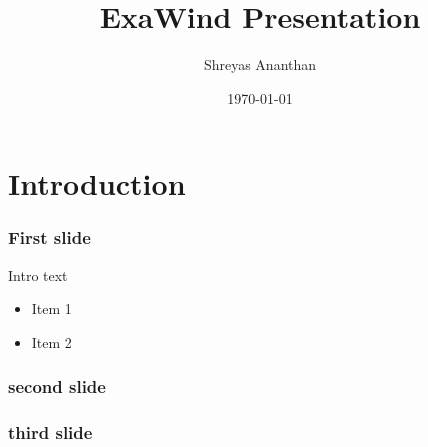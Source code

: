 \documentclass[aspectratio=1610,10pt]{beamer}
\title{ExaWind Presentation}
\author{Shreyas Ananthan}
\institute[NREL]{National Renewable Energy Laboratory \\ Golden, CO}
\date{\today}
\begin{document}
\maketitle

\section{Introduction}

\begin{frame}
  \frametitle{First slide}
  Intro text
  \begin{itemize}
  \item Item 1
  \item Item 2
  \end{itemize}
\end{frame}

\begin{frame}
  \frametitle{second slide}
\end{frame}

\begin{frame}
  \frametitle{third slide}
\end{frame}

\ecpacknowledge{}
\end{document}
